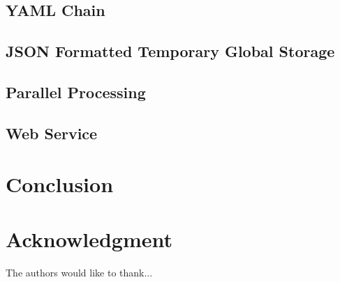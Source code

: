 \documentclass[conference]{IEEEtran}
\begin{document}
\subsection{YAML Chain}
\blindtext

\subsection{JSON Formatted Temporary Global Storage}
\blindtext

\subsection{Parallel Processing}
\blindtext

\subsection{Web Service}
\blindtext


\section{Conclusion}
\blindtext 


\section*{Acknowledgment}
The authors would like to thank...

\ifCLASSOPTIONcaptionsoff
  \newpage
\fi




\end{document}
